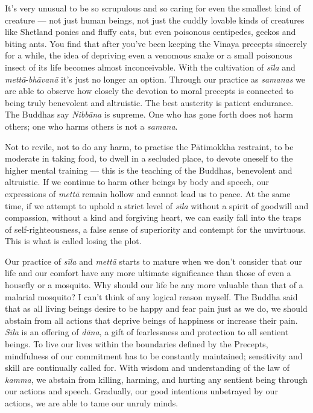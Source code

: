 It's very unusual to be so scrupulous and so caring for even the
smallest kind of creature --- not just human beings, not just the cuddly
lovable kinds of creatures like Shetland ponies and fluffy cats, but
even poisonous centipedes, geckos and biting ants. You find that after
you've been keeping the Vinaya precepts sincerely for a while, the idea
of depriving even a venomous snake or a small poisonous insect of its
life becomes almost inconceivable. With the cultivation of \emph{sīla}
and \emph{mettā}-\emph{bhāvanā} it's just no longer an option. Through
our practice as \emph{samanas} we are able to observe how closely the
devotion to moral precepts is connected to being truly benevolent and
altruistic. The best austerity is patient endurance. The Buddhas say
\emph{Nibbāna} is supreme. One who has gone forth does not harm others;
one who harms others is not a \emph{samana}.

Not to revile, not to do any harm, to practise the Pātimokkha restraint,
to be moderate in taking food, to dwell in a secluded place, to devote
oneself to the higher mental training --- this is the teaching of the
Buddhas, benevolent and altruistic. If we continue to harm other beings
by body and speech, our expressions of \emph{mettā} remain hollow and
cannot lead us to peace. At the same time, if we attempt to uphold a
strict level of \emph{sīla} without a spirit of goodwill and compassion,
without a kind and forgiving heart, we can easily fall into the traps of
self-righteousness, a false sense of superiority and contempt for the
unvirtuous. This is what is called losing the plot.

Our practice of \emph{sīla} and \emph{mettā} starts to mature when we
don't consider that our life and our comfort have any more ultimate
significance than those of even a housefly or a mosquito. Why should our
life be any more valuable than that of a malarial mosquito? I can't
think of any logical reason myself. The Buddha said that as all living
beings desire to be happy and fear pain just as we do, we should abstain
from all actions that deprive beings of happiness or increase their
pain. \emph{Sīla} is an offering of \emph{dāna}, a gift of fearlessness
and protection to all sentient beings. To live our lives within the
boundaries defined by the Precepts, mindfulness of our commitment has to
be constantly maintained; sensitivity and skill are continually called
for. With wisdom and understanding of the law of \emph{kamma}, we
abstain from killing, harming, and hurting any sentient being through
our actions and speech. Gradually, our good intentions unbetrayed by our
actions, we are able to tame our unruly minds.

